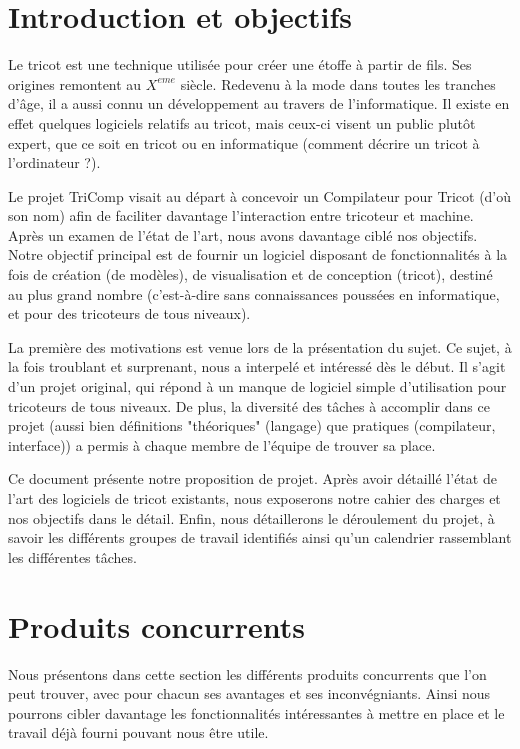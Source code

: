 \documentclass{article}
\begin{document}
\section{Introduction et objectifs}

Le tricot est une technique utilisée pour créer une étoffe à partir de fils. Ses origines remontent au $X^{eme}$ siècle.
Redevenu à la mode dans toutes les tranches d'âge, il a aussi connu un développement au travers de l'informatique. Il existe en effet
quelques logiciels relatifs au tricot, mais ceux-ci visent un public plutôt expert, que ce soit en tricot ou en informatique (comment
décrire un tricot à l'ordinateur ?).

Le projet TriComp visait au départ à concevoir un Compilateur pour Tricot (d'où son nom) afin de faciliter davantage l'interaction entre
tricoteur et machine. Après un examen de l'état de l'art, nous avons davantage ciblé nos objectifs. Notre objectif principal est de
fournir un logiciel disposant de fonctionnalités à la fois de création (de modèles), de visualisation et de conception (tricot),
destiné au plus grand nombre (c'est-à-dire sans connaissances poussées en informatique, et pour des tricoteurs de tous niveaux).

La première des motivations est venue lors de la présentation du sujet. Ce sujet, à la fois troublant et surprenant, nous a interpelé et 
intéressé dès le début. Il s'agit d'un projet original, qui répond à un manque de logiciel simple d'utilisation pour tricoteurs de tous
niveaux. De plus, la diversité des tâches à accomplir dans ce projet (aussi bien définitions "théoriques" (langage) que pratiques 
(compilateur, interface)) a permis à chaque membre de l'équipe de trouver sa place.

Ce document présente notre proposition de projet. Après avoir détaillé l'état de l'art des logiciels de tricot existants, nous exposerons
notre cahier des charges et nos objectifs dans le détail. Enfin, nous détaillerons le déroulement du projet, à savoir les différents
groupes de travail identifiés ainsi qu'un calendrier rassemblant les différentes tâches.

\tableofcontents
\section{Produits concurrents}

Nous présentons dans cette section les différents produits concurrents que l'on peut trouver, avec pour chacun ses avantages et ses 
inconvégniants. Ainsi nous pourrons cibler davantage les fonctionnalités intéressantes à mettre en place et le travail déjà fourni pouvant
nous être utile.
\end{document}
